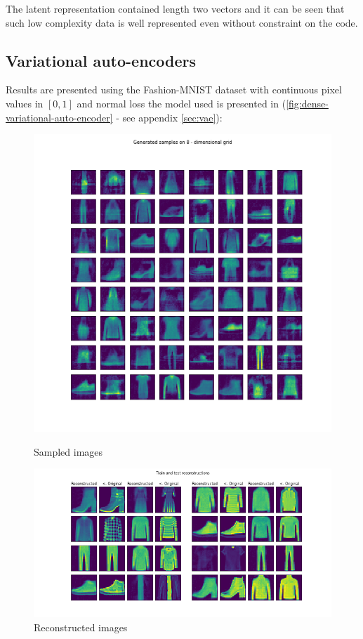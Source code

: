\documentclass[12pt, english]{article}
\begin{document}
\par The latent representation contained length two vectors and it can be seen that such low complexity data is well represented even without constraint on the code.

\newpage

\subsection{Variational auto-encoders}

\vspace{5mm}

\par Results are presented using the Fashion-MNIST dataset with continuous pixel values in $[0, 1]$ and normal loss the model used is presented in (\ref{fig:dense-variational-auto-encoder} - see appendix \ref{sec:vae}):

\vspace{4mm}

\begin{figure}[ht] 
  \label{fig:auto_encoder_results} 
  \begin{minipage}{0.5\linewidth}
    \centering
    \includegraphics[width=.65\linewidth]{gen/generated_samples_fashion_mnist_dense_vae.png} 
    \caption{Sampled images} 
  \end{minipage}%
  \begin{minipage}{0.5\linewidth}
    \centering
    \includegraphics[width=.95\linewidth]{reco/reconstrunction_samples_fashion_mnist_dense_vae.png} 
    \caption{Reconstructed images} 
  \end{minipage} 
\end{figure}
\end{document}
